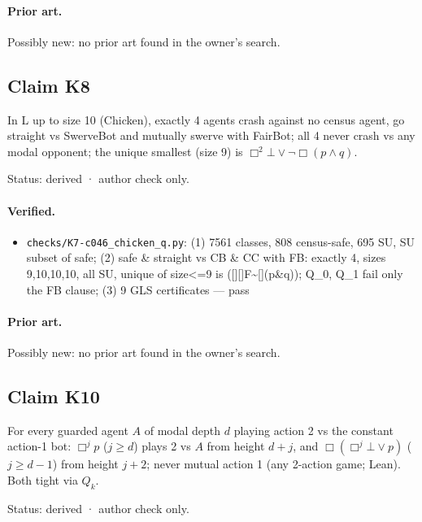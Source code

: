\documentclass{article}
\begin{document}
\paragraph{Prior art.} Possibly new: no prior art found in the owner's search.

\subsection*{Claim K8}

In L up to size 10 (Chicken), exactly 4 agents crash against no census agent, go straight vs SwerveBot and mutually swerve with FairBot; all 4 never crash vs any modal opponent; the unique smallest (size 9) is $\Box^2\bot\vee\neg\Box(p\wedge q)$.

Status: derived · author check only.

\paragraph{Verified.}
\begin{itemize}
\item \texttt{checks/K7-c046\_chicken\_q.py}: (1) 7561 classes, 808 census-safe, 695 SU, SU subset of safe; (2) safe \& straight vs CB \& CC with FB: exactly 4, sizes 9,10,10,10, all SU, unique of size\textless{}=9 is ([][]F\textbar{}\textasciitilde{}[](p\&q)); Q\_0, Q\_1 fail only the FB clause; (3) 9 GLS certificates --- pass
\end{itemize}

\paragraph{Prior art.} Possibly new: no prior art found in the owner's search.

\subsection*{Claim K10}

For every guarded agent $A$ of modal depth $d$ playing action 2 vs the constant action-1 bot: $\Box^jp$ ($j\ge d$) plays 2 vs $A$ from height $d+j$, and $\Box(\Box^j\bot\vee p)$ ($j\ge d-1$) from height $j+2$; never mutual action 1 (any 2-action game; Lean). Both tight via $Q_k$.

Status: derived · author check only.
\end{document}
